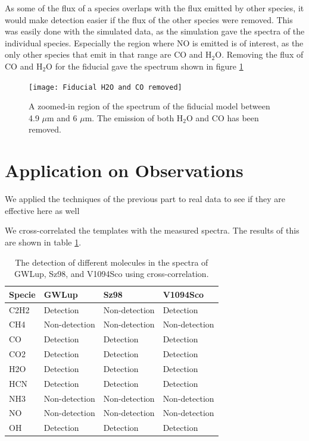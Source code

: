 \documentclass[oneside, single, authoryear, semicolon]{lion-msc}
\newcommand{\4}{$_4$}
\newcommand{\3}{$_3$}
\newcommand{\2}{$_2$}
\begin{document}


As some of the flux of a species overlaps with the flux emitted by other species, it would make detection easier if the flux of the other species were removed. This was easily done with the simulated data, as the simulation gave the spectra of the individual species. Especially the region where NO is emitted is of interest, as the only other species that emit in that range are CO and H\2O. Removing the flux of CO and H\2O for the fiducial gave the spectrum shown in figure \ref{fig: H2O and CO removed}

\begin{figure}
    \centering
    \texttt{[image: Fiducial H2O and CO removed]}
    \caption{A zoomed-in region of the spectrum of the fiducial model between 4.9 $\mu$m and 6 $\mu$m. The emission of both H\2O and CO has been removed.}
    \label{fig: H2O and CO removed}
\end{figure}

\section{Application on Observations}
We applied the techniques of the previous part to real data to see if they are effective here as well

We cross-correlated the templates with the measured spectra. The results of this are shown in table \ref{tab: realdata}.

\begin{table}[!ht]
\centering
\begin{tabular}{llll}
\hline
\textbf{Specie} & \textbf{GWLup} & \textbf{Sz98} & \textbf{V1094Sco} \\ \hline
C2H2            & Detection      & Non-detection & Detection         \\
CH4             & Non-detection  & Non-detection & Non-detection     \\
CO              & Detection      & Detection     & Detection         \\
CO2             & Detection      & Detection     & Detection         \\
H2O             & Detection      & Detection     & Detection         \\
HCN             & Detection      & Detection     & Detection         \\
NH3             & Non-detection  & Non-detection & Non-detection     \\
NO              & Non-detection  & Non-detection & Non-detection     \\
OH              & Detection      & Detection     & Detection         \\ \hline
\end{tabular}
\caption{The detection of different molecules in the spectra of GWLup, Sz98, and V1094Sco using cross-correlation.}
\label{tab: realdata}
\end{table}
\end{document}
